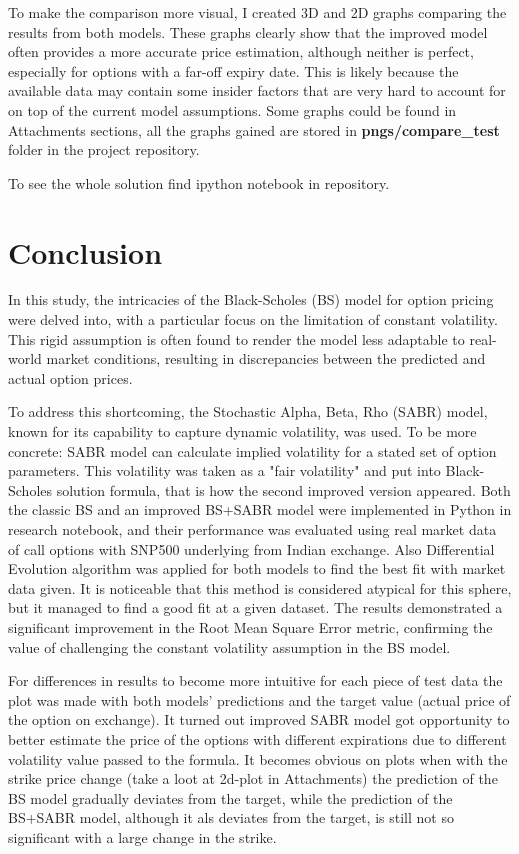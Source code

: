 \documentclass[a4paper,fleqn,12pt]{extarticle}
\begin{document}
	To make the comparison more visual, I created 3D and 2D graphs comparing the results from both models. These graphs clearly show that the improved model often provides a more accurate price estimation, although neither is perfect, especially for options with a far-off expiry date. This is likely because the available data may contain some insider factors that are very hard to account for on top of the current model assumptions. Some graphs could be found in Attachments sections, all the graphs gained are stored in \textbf{pngs/compare\_test} folder in the project repository.

	To see the whole solution find ipython notebook in repository.
	

	\newpage
	\section{Conclusion}
	In this study, the intricacies of the Black-Scholes (BS) model for option pricing were delved into, with a particular focus on the limitation of constant volatility. This rigid assumption is often found to render the model less adaptable to real-world market conditions, resulting in discrepancies between the predicted and actual option prices.

	To address this shortcoming, the Stochastic Alpha, Beta, Rho (SABR) model, known for its capability to capture dynamic volatility, was used. To be more concrete: SABR model can calculate implied volatility for a stated set of option parameters. This volatility was taken as a "fair volatility" and put into Black-Scholes solution formula, that is how the second improved version appeared. Both the classic BS and an improved BS+SABR model were implemented in Python in research notebook, and their performance was evaluated using real market data of call options with SNP500 underlying from Indian exchange. Also Differential Evolution algorithm was applied for both models to find the best fit with market data given. It is noticeable that this method is considered atypical for this sphere, but it managed to find a good fit at a given dataset. The results demonstrated a significant improvement in the Root Mean Square Error metric, confirming the value of challenging the constant volatility assumption in the BS model.

	For differences in results to become more intuitive for each piece of test data the plot was made with both models' predictions and the target value (actual price of the option on exchange). It turned out improved SABR model got opportunity to better estimate the price of the options with different expirations due to different volatility value passed to the formula. It becomes obvious on plots when with the strike price change (take a loot at 2d-plot in Attachments) the prediction of the BS model gradually deviates from the target, while the prediction of the BS+SABR model, although it als deviates from the target, is still not so significant with a large change in the strike.
\end{document}
